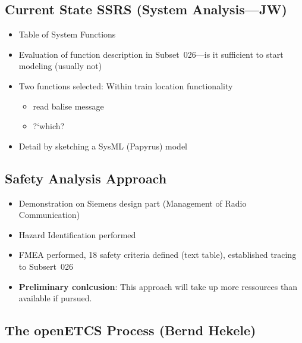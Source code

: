 \documentclass[a4paper,german]{article}
\newcommand{\qq}[1]{?`#1?}
\begin{document}
\subsection{Current State SSRS (System Analysis---JW)}
\label{sec:current-state-ssrs}

\begin{itemize}
\item Table of System Functions
\item Evaluation of function description in Subset~026---is it
  sufficient to start modeling (usually not)
\item Two functions selected: Within train location functionality
  \begin{itemize}
  \item read balise message
  \item \qq{which}
  \end{itemize}
\item Detail by sketching a SysML (Papyrus) model
\end{itemize}


\subsection{Safety Analysis Approach}
\label{sec:safety-analysis}

\begin{itemize}
\item Demonstration on Siemens design part (Management of Radio Communication)
\item Hazard Identification performed
\item FMEA performed, 18 safety criteria defined (text table),
  established tracing to Subsert~026
\item \textbf{Preliminary conlcusion}:  This approach will take up
  more ressources than available if pursued.
\end{itemize}

\subsection{The openETCS Process (Bernd Hekele)}
\label{sec:open-proc-bernd}
\end{document}
